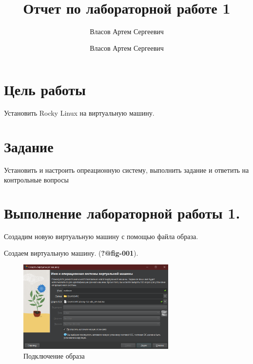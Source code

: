 \documentclass[
  12pt,
  a4paper,
  DIV=11,
  numbers=noendperiod]{scrreprt}
\title{Отчет по лабораторной работе 1}
\subtitle{Власов Артем Сергеевич}
\author{Власов Артем Сергеевич}
\date{}
\renewcommand*\contentsname{Содержание}
\newcommand\contentsname{Содержание}
\begin{document}
\maketitle

\renewcommand*\contentsname{Содержание}
{
\setcounter{tocdepth}{1}
\tableofcontents
}
\listoffigures
\listoftables
{}
\chapter{Цель
работы}\label{ux446ux435ux43bux44c-ux440ux430ux431ux43eux442ux44b}

Установить Rocky Linux на виртуальную машину.

\chapter{Задание}\label{ux437ux430ux434ux430ux43dux438ux435}

Установить и настроить опреационную систему, выполнить задание и
ответить на контрольные вопросы

\chapter{Выполнение лабораторной работы
1.}\label{ux432ux44bux43fux43eux43bux43dux435ux43dux438ux435-ux43bux430ux431ux43eux440ux430ux442ux43eux440ux43dux43eux439-ux440ux430ux431ux43eux442ux44b-1.}

Создадим новую виртуальную машину с помощью файла образа.

Создаем виртуальную машину. (\textbf{?@fig-001}).

\begin{figure}

{\centering \includegraphics[width=0.7\textwidth,height=\textheight]{image/1.png}

}

\caption{Подключение образа}

\end{figure}%
\end{document}
